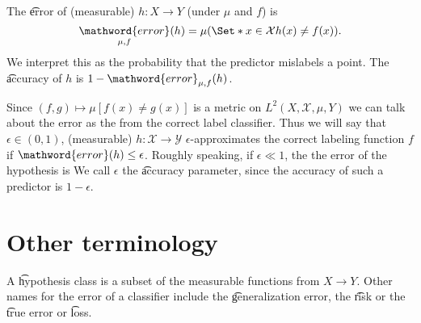 The \t{error} of (measurable) $h: X \to Y$ (under $\mu $ and $f$) is
    \[
\underset{\mu , f}{\mathword{error}}(h) = \mu (\Set*{x \in \mathcal{X} }{h(x) \neq f(x)}).
    \]
We interpret this as the probability that the predictor mislabels a point.
The \t{accuracy} of $h$ is $1 - \mathword{error}_{\mu , f}(h)$.

Since $(f, g) \mapsto \mu [f(x) \neq g(x)]$ is a metric on $L^2(X, \mathcal{X} , \mu , Y)$ we can talk about the error as the  from the correct label classifier.
Thus we will say that $\epsilon  \in (0, 1)$, (measurable) $h: \mathcal{X}  \to \mathcal{Y} $ \t{$\epsilon $-approximates} the correct labeling function $f$ if $\mathword{error}(h) \leq \epsilon $.
Roughly speaking, if $\epsilon  \ll 1$, the the error of the hypothesis is 
We call $\epsilon $ the \t{accuracy parameter}, since the accuracy of such a predictor is $1 - \epsilon $.

\section*{Other terminology}

A \t{hypothesis class} is a subset of the measurable functions from $X \to Y$.
Other names for the error of a classifier include the \t{generalization error}, the \t{risk} or the \t{true error} or \t{loss}.
